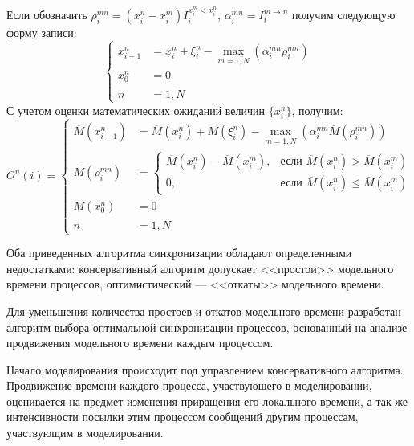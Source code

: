 Если обозначить $\rho_i^{mn}=(x_i^n-x_i^m)I_i^{x_i^m<x_i^n}$, $\alpha_i^{mn}=I_i^{m\rightarrow n}$ получим следующую форму записи:
\begin{equation}
\label{eq:АС с синхронизацией взаимодействий}
\left\{
\begin{aligned}
x_{i+1}^n & = x_i^n + \xi_i^n-\max\limits_{m=\overline{1, N}}(\alpha_i^{mn}\rho_i^{mn})\\
x_0^n & = 0\\
n & = \overline{1, N}
\end{aligned}
\right.
\end{equation}
С учетом оценки математических ожиданий величин $\{x_i^{n}\}$, получим:
\begin{equation}
\label{eq:АС с синхронизацией взаимодействий}
O^n(i)=
\left\{
\begin{aligned}
\overline{M}(x_{i+1}^n) & = \overline{M}(x_i^n) + M(\xi_i^n)-\max\limits_{m=\overline{1, N}}(\alpha_i^{mn}\overline{M}(\rho_i^{mn}))\\
\overline{M}(\rho_i^{mn}) & = \begin{cases}
\overline{M}(x_i^n)-\overline{M}(x_i^m), & \text{если $\overline{M}(x_i^n)>\overline{M}(x_i^m)$} \\
 0, & \text{если $\overline{M}(x_i^n)\leqslant\overline{M}(x_i^m)$}
 \end{cases}\\
M(x_0^n) & = 0\\
n & = \overline{1, N}
\end{aligned}
\right.
\end{equation}

Оба приведенных алгоритма синхронизации обладают определенными недостатками: консервативный алгоритм допускает <<простои>> модельного времени процессов, оптимистический --- <<откаты>> модельного времени.

Для уменьшения количества простоев и откатов модельного времени разработан алгоритм выбора оптимальной синхронизации процессов, основанный на анализе продвижения модельного времени каждым процессом.

Начало моделирования происходит под управлением консервативного алгоритма. Продвижение времени каждого процесса, участвующего в моделировании, оценивается на предмет изменения приращения его локального времени, а так же интенсивности посылки этим процессом сообщений другим процессам, участвующим в моделировании.


